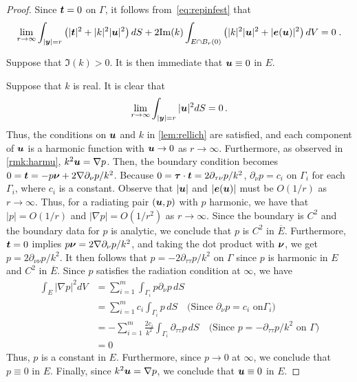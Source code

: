 \begin{proof}
Since ${\boldsymbol t} = 0$ on $\Gamma$, it follows
from~\cref{eq:repinfest} that
\begin{equation}
\lim_{r\to\infty}
\int_{|{\boldsymbol y}|=r} \left( |{\boldsymbol t}|^2 + |k|^2 |{\boldsymbol u}|^2 \right) dS +
2 {\textrm{\textup{Im}}}(k) \int_{E \cap B_{r}(0)} \left(|k|^2 |{\boldsymbol u}|^2 + |{\boldsymbol e}({\boldsymbol u})|^2 \right)
dV = 0 \; . \nonumber
\end{equation}

Suppose that $\Im(k) > 0$. It is then immediate
that ${\boldsymbol u} \equiv 0$ in $E$.

Suppose that $k$ is real. It is clear that
\begin{equation}
\lim_{r\to\infty} \int_{|{\boldsymbol y}|=r} |{\boldsymbol u}|^2 dS = 0 \, . \nonumber
\end{equation}
Thus, the conditions on ${\boldsymbol u}$ and $k$ in \cref{lem:rellich}
are satisfied, and each component of ${\boldsymbol u}$ is a harmonic function
with ${\boldsymbol u} \to 0$ as $r \to \infty$. Furthermore, as observed
in \cref{rmk:harmu}, $k^2 {\boldsymbol u} = \nabla p$. Then, the boundary
condition becomes $0 = {\boldsymbol t} = -p {\boldsymbol \nu} + 2 \nabla \partial_\nu p/k^2$.
Because $0 = {\boldsymbol \tau} \cdot {\boldsymbol t} = 2\partial_{\tau\nu} p/k^2$,
$\partial_\nu p  = c_{i}$ on $\Gamma_{i}$ for each $\Gamma_{i}$,
where $c_{i}$ is a constant. 
Observe that $|{\boldsymbol u}|$ and $|{\boldsymbol e}({\boldsymbol u})|$ must be $O(1/r)$ as
$r\to\infty$. Thus,
for a radiating pair $({\boldsymbol u},p)$ with $p$ harmonic,
we have that $|p| = O(1/r)$ and $|\nabla p| = O(1/r^2)$
as $r\to\infty$.
Since the boundary is $C^{2}$ and the boundary data for $p$
is analytic, we conclude that $p$ is $C^{2}$ in
$\overline{E}$.
Furthermore, ${\boldsymbol t}=0$ implies $p {\boldsymbol \nu} = 2\nabla \partial_{\nu} p/k^2$, 
and taking the dot
product with ${\boldsymbol \nu}$, we get
$p = 2\partial_{\nu \nu}p/k^2$. 
It then follows that
$p = -2\partial_{\tau \tau}p/k^2$ on $\Gamma$ since 
$p$ is harmonic in $E$ and $C^{2}$ in $\overline{E}$. 
Since $p$ satisfies the radiation condition at $\infty$,
we have
\begin{equation}
\begin{aligned}
\int_{E} |\nabla p|^2 dV &= 
\sum_{i=1}^{m} \int_{\Gamma_{i}} p \partial_{\nu}p \,dS \\
&= \sum_{i=1}^{m} c_{i} \int_{\Gamma_{i}} p \,dS \quad \text{(Since $\partial_{\nu} p = c_{i}$ on
$\Gamma_{i}$)} \\ 
&= -\sum_{i=1}^{m} \frac{2c_{i}}{k^2} \int_{\Gamma_{i}} \partial_{\tau \tau} p \,dS 
\quad \text{(Since $p = -\partial_{\tau \tau}p/k^2$ on $\Gamma$)} \\
&= 0
\end{aligned}
\end{equation}
Thus, $p$ is a constant in $E$. Furthermore, since $p\to 0$ at $\infty$, 
we conclude that $p\equiv 0$ in $E$. 
Finally, since $k^2 {\boldsymbol u} = \nabla p$, we conclude that ${\boldsymbol u}\equiv 0$ in 
$E$.
\end{proof}

